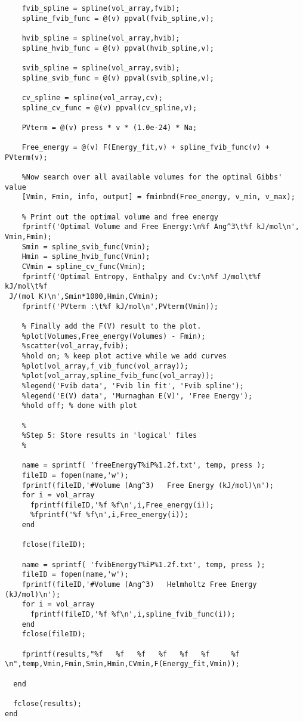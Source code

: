 \documentclass[11pt,letterpaper]{article}
\begin{document}
\begin{spacing}{1.0}
\begin{verbatim}
    fvib_spline = spline(vol_array,fvib);
    spline_fvib_func = @(v) ppval(fvib_spline,v);
  
    hvib_spline = spline(vol_array,hvib);
    spline_hvib_func = @(v) ppval(hvib_spline,v);  
  
    svib_spline = spline(vol_array,svib);
    spline_svib_func = @(v) ppval(svib_spline,v); 
  
    cv_spline = spline(vol_array,cv);
    spline_cv_func = @(v) ppval(cv_spline,v); 

    PVterm = @(v) press * v * (1.0e-24) * Na; 

    Free_energy = @(v) F(Energy_fit,v) + spline_fvib_func(v) + PVterm(v); 
    
    %Now search over all available volumes for the optimal Gibbs' value
    [Vmin, Fmin, info, output] = fminbnd(Free_energy, v_min, v_max);
  
    % Print out the optimal volume and free energy
    fprintf('Optimal Volume and Free Energy:\n%f Ang^3\t%f kJ/mol\n',
Vmin,Fmin);
    Smin = spline_svib_func(Vmin);
    Hmin = spline_hvib_func(Vmin);
    CVmin = spline_cv_func(Vmin);
    fprintf('Optimal Entropy, Enthalpy and Cv:\n%f J/mol\t%f kJ/mol\t%f
 J/(mol K)\n',Smin*1000,Hmin,CVmin);
    fprintf('PVterm :\t%f kJ/mol\n',PVterm(Vmin));
    
    % Finally add the F(V) result to the plot.
    %plot(Volumes,Free_energy(Volumes) - Fmin);
    %scatter(vol_array,fvib); 
    %hold on; % keep plot active while we add curves
    %plot(vol_array,f_vib_func(vol_array));
    %plot(vol_array,spline_fvib_func(vol_array));
    %legend('Fvib data', 'Fvib lin fit', 'Fvib spline');
    %legend('E(V) data', 'Murnaghan E(V)', 'Free Energy');
    %hold off; % done with plot
  
    %
    %Step 5: Store results in 'logical' files
    %
  
    name = sprintf( 'freeEnergyT%iP%1.2f.txt', temp, press );
    fileID = fopen(name,'w');
    fprintf(fileID,'#Volume (Ang^3)   Free Energy (kJ/mol)\n');
    for i = vol_array
      fprintf(fileID,'%f %f\n',i,Free_energy(i));
      %fprintf('%f %f\n',i,Free_energy(i));
    end

    fclose(fileID);
    
    name = sprintf( 'fvibEnergyT%iP%1.2f.txt', temp, press );
    fileID = fopen(name,'w');
    fprintf(fileID,'#Volume (Ang^3)   Helmholtz Free Energy (kJ/mol)\n');
    for i = vol_array
      fprintf(fileID,'%f %f\n',i,spline_fvib_func(i));
    end
    fclose(fileID);
    
    fprintf(results,"%f   %f   %f   %f   %f   %f     %f
\n",temp,Vmin,Fmin,Smin,Hmin,CVmin,F(Energy_fit,Vmin));

  end
  
  fclose(results);
end

\end{verbatim}

\end{spacing}
\end{document}
